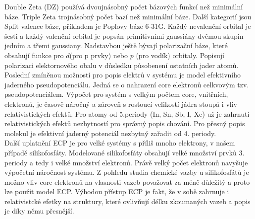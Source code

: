 \documentclass[
  digital, %
  table,   %
  lof,     %
  lot,     %
  oneside,
]{fithesis3}
\begin{document}
Double Zeta (DZ) používá dvoujnásobný počet bázových funkcí než minimální báze. Triple Zeta trojnásobný počet bazí než minimální báze. Další kategorií jsou Split valence báze, příkladem je Poplovy báze 6-31G. Každý nevalenční orbital je šesti a každý valenční orbital je popsán primitivními gaussiány dvěmou skupin - jedním a třemi gaussiany. Nadstavbou ještě bývají polarizační báze, které obsahují funkce pro $d$(pro p prvky) nebo $p$ (pro vodík) orbitaly. Popisují polarizaci elektornového obalu v důsledku působenení ostatních jader atomů. \\
Poslední zmíněnou možností pro popis elektrů v systému je model efektivního jaderného pseudopotenciálu. Jedná se o nahrazení core elektronů celkvovým tzv. pseudopotenciálem. Výpočet pro systém s velkým počtem core, vnitřních, elektronů, je časově náročný a zároveň s rostoucí velikostí jádra stoupá i vliv relativistických efektů. Pro atomy od 5.periody (In, Sn, Sb, I, Xe) už je zahrnutí relativistických efektů nezbytností pro správný popis chování. Pro přesný popis molekul je efektivní jaderný potenciál nezbytný zařadit od 4. periody. \\
Další uplatnění ECP je pro velké systémy s příliš mnoho elektrony, v našem případě silikofosfáty. Modelované silikofosfáty obsahují velké množství prvků 3. periody a tedy i velké množství elektronů. Právě velký počet elektronů navyšuje výpočetní náročnost systému. Z pohledu studia chemické vazby u silikofosfátů je možno vliv core elektronů na vlasnosti vazeb považovat za méně důležitý a proto lze použít model ECP. Výhodou přístup ECP je fakt, že v sobě zahrnuje i relativistcké efetky na struktury, které ovlivňují délku zkoumaných vazeb a popis je díky němu přesnější.
\end{document}
